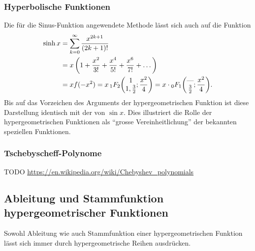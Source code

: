 \subsubsection{Hyperbolische Funktionen}
Die für die Sinus-Funktion angewendete Methode lässt sich auch
auf die Funktion 
\begin{align*}
\sinh x
&=
\sum_{k=0}^\infty \frac{x^{2k+1}}{(2k+1)!}
\\
&=
x
\,
\biggl(
1+\frac{x^2}{3!} + \frac{x^4}{5!}+\frac{x^6}{7!}+\dots
\biggr)
\\
&=
xf(-x^2)
=
x\,\mathstrut_1F_2\biggl(
\begin{matrix}1\\1,\frac{3}{2}\end{matrix}
;\frac{x^2}{4}
\biggr)
=
x\cdot\mathstrut_0F_1\biggl(
\begin{matrix}\text{---}\\\frac{3}{2}\end{matrix}
;\frac{x^2}4
\biggr).
\end{align*}
Bis auf das Vorzeichen des Arguments der hypergeometrischen Funktion
ist diese Darstellung identisch mit der von $\sin x$.
Dies illustriert die Rolle der hypergeometrischen Funktionen als
``grosse Vereinheitlichung'' der bekannten speziellen Funktionen.

\subsubsection{Tschebyscheff-Polynome}

TODO
\url{https://en.wikipedia.org/wiki/Chebyshev_polynomials}

%
%
\subsection{Ableitung und Stammfunktion hypergeometrischer Funktionen}
Sowohl Ableitung wie auch Stammfunktion einer hypergeometrischen
Funktion lässt sich immer durch hypergeometrische Reihen ausdrücken.

